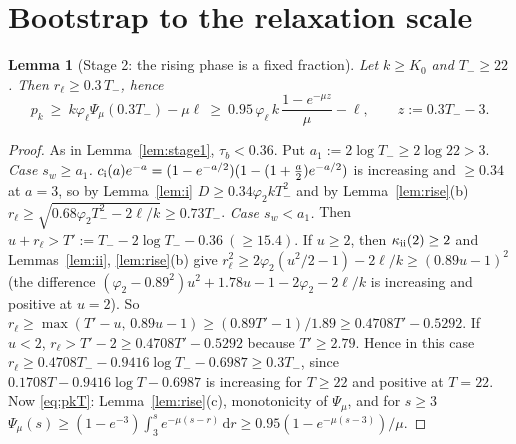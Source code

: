 \documentclass[11pt,a4paper]{article}
\newtheorem{lemma}[theorem]{Lemma}
\theoremstyle{remark}\newtheorem{remark}[theorem]{Remark}
\newcommand{\dd}{\,\mathrm d}
\begin{document}
\section{Bootstrap to the relaxation scale}
\begin{lemma}[Stage 2: the rising phase is a fixed fraction]\label{lem:stage2}
Let $k\ge K_0$ and $T_-\ge22$. Then $r_\ell\ge0.3\,T_-$, hence
\begin{equation}\label{eq:pkT}
p_k\ \ge\ k\varphi_\ell\Psi_\mu(0.3T_-)-\mu\ell\ \ge\ 0.95\,\varphi_\ell\,k\,\frac{1-e^{-\mu z}}{\mu}-\ell,
\qquad z:=0.3T_--3 .
\end{equation}
\end{lemma}
\begin{proof}
As in Lemma~\ref{lem:stage1}, $\tau_b<0.36$. Put $a_1:=2\log T_-\ge2\log22>3$.
\emph{Case $s_w\ge a_1$.} $c_{\rm i}(a)e^{-a}=(1-e^{-a/2})(1-(1+\frac a2)e^{-a/2})$ is increasing and
$\ge0.34$ at $a=3$, so by Lemma~\ref{lem:i} $D\ge0.34\varphi_2kT_-^2$ and by Lemma~\ref{lem:rise}(b)
$r_\ell\ge\sqrt{0.68\varphi_2T_-^2-2\ell/k}\ge0.73T_-$.
\emph{Case $s_w<a_1$.} Then $u+r_\ell>T':=T_--2\log T_--0.36\ (\ge15.4)$. If $u\ge2$, then
$\kappa_{\rm ii}(2)\ge2$ and Lemmas~\ref{lem:ii}, \ref{lem:rise}(b) give
$r_\ell^2\ge2\varphi_2(u^2/2-1)-2\ell/k\ge(0.89u-1)^2$ (the difference
$(\varphi_2-0.89^2)u^2+1.78u-1-2\varphi_2-2\ell/k$ is increasing and positive at $u=2$). So
$r_\ell\ge\max(T'-u,\,0.89u-1)\ge(0.89T'-1)/1.89\ge0.4708T'-0.5292$. If $u<2$,
$r_\ell>T'-2\ge0.4708T'-0.5292$ because $T'\ge2.79$. Hence in this case
$r_\ell\ge0.4708T_--0.9416\log T_--0.6987\ge0.3T_-$, since $0.1708T-0.9416\log T-0.6987$ is increasing
for $T\ge22$ and positive at $T=22$.
Now \eqref{eq:pkT}: Lemma~\ref{lem:rise}(c), monotonicity of $\Psi_\mu$, and for $s\ge3$
$\Psi_\mu(s)\ge(1-e^{-3})\int_3^se^{-\mu(s-r)}\dd r\ge0.95(1-e^{-\mu(s-3)})/\mu$.
\end{proof}
\end{document}
